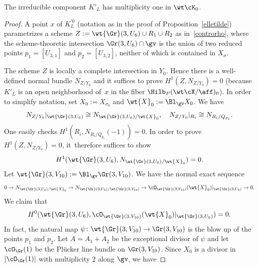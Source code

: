 \begin{prop}\label{multelletilde}
The irreducible component $K'_L$ has multiplicity one in $\wt\cK_0$.
\end{prop}

\begin{proof}
A point $x$ of $K_L^{\prime0}$ (notation as in the proof of Proposition~\ref{elletilde}) parametrizes a scheme $Z:=\wt{\Gr}(3,U_6)\cup R_1\cup R_2$ as in~\eqref{controrho}, where
the scheme-theoretic intersection
$\Gr(3,U_6)\cap\gv$ is the union of two reduced points
$p_1=[U_{3,1}]$ and $p_2= [U_{3,2}]$, neither of which is contained in $X_{\sigma}$.

The scheme $Z$ is locally a complete intersection in $Y_0$. Hence there is a well-defined normal bundle $N_{Z/Y_0}$ and it suffices to prove $H^1(Z,N_{Z/Y_0})=0$ (because $ K'_L$ is an open neighborhood of~$x$ in the fiber $\Hilb_P(\wt\cX/\aff)_0 $). In order to simplify notation, set $X_0:=X_{\sigma_0}$ and $\wt{X}_0:=\Bl_{\gv}X_0$. We have\vspace*{-3pt}
\[
N_{Z/Y_0}\vert_{\wt{\Gr}(3,U_6)}\cong N_{\wt{\Gr}(3,U_6)/\wt{X}_0},\quad N_{Z/Y_0}\vert_{R_i}\cong N_{R_i/Q_{p_i}}.
\]
One easily checks $H^1(R_i,N_{R_i/Q_{p_i}}(-1))=0$. In order to prove $H^1(Z,N_{Z/Y_0})=0$, it~therefore suffices to show\vspace*{-3pt}
\begin{equation}\label{svaporaz}
H^1(\wt{\Gr}(3,U_6),N_{\wt{\Gr}(3,U_6)/\wt{X}_0})=0.
\end{equation}
Let $\wt{\Gr}(3,V_{10}):=\Bl_{\gv}\Gr(3,V_{10})$.
We have the normal exact sequence\vspace*{-3pt}
\begin{equation}\label{normnorm}
0 \to N_{\wt{\Gr}(3,U_6)/\wt{X}_0}\to N_{\wt{\Gr}(3,U_6)/\wt{\Gr}(3,V_{10})}\to \cO_{\wt{\Gr}(3,V_{10})}(\wt{X}_0)\vert_{\wt{\Gr}(3,U_6)}\to 0.
\end{equation}
We claim that\vspace*{-3pt}
\begin{equation}\label{nosezioni}
H^0(\wt{\Gr}(3,U_6), \cO_{\wt{\Gr}(3,V_{10})}(\wt{X}_0)\vert_{\wt{\Gr}(3,U_6)})= 0.
\end{equation}
In fact, the natural map $\psi\colon \wt{\Gr}(3,V_{10})\to \Gr(3,V_{10})$ is the blow up of the points $p_1$ and $p_2$. Let $A=A_1+A_2$ be the exceptional divisor of $\psi$ and let $\cO_{\Gr}(1)$ be the Plücker line bundle on $\Gr(3,V_{10})$. Since $X_0$ is a divisor in $|\cO_{\Gr}(1)|$ with multiplicity $2$ along $\gv$, we have\vspace*{-3pt}

\end{proof}
